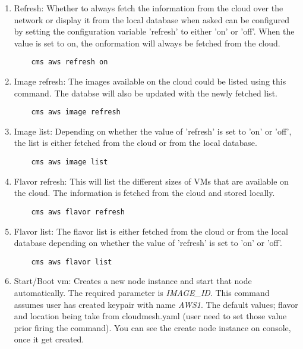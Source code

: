 \documentclass[9pt,twocolumn,twoside]{../../styles/osajnl}
\begin{document}
\begin{enumerate}
	
	\item Refresh: Whether to always fetch the information from the cloud over the network or display it from the local database when asked can be configured by setting the configuration variable 'refresh' to either 'on' or 'off'. When the value is set to on, the onformation will always be fetched from the cloud.
	
	\begin{verbatim}
    cms aws refresh on
	\end{verbatim}
	
	\item Image refresh: The images available on the cloud could be listed using this command. The databse will also be updated with the newly fetched list.
	
	\begin{verbatim}
    cms aws image refresh
	\end{verbatim}
	
	\item Image list: Depending on whether the value of 'refresh' is set to 'on' or 'off', the list is either fetched from the cloud or from the local database.
	
	\begin{verbatim}
    cms aws image list
	\end{verbatim}
	
	\item Flavor refresh: This will list the different sizes of VMs that are available on the cloud. The information is fetched from the cloud and stored locally.
	
	\begin{verbatim}
    cms aws flavor refresh
	\end{verbatim}
	
	\item Flavor list: The flavor list is either fetched from the cloud or from the local database depending on whether the value of 'refresh' is set to 'on' or 'off'.
	
	\begin{verbatim}
    cms aws flavor list
	\end{verbatim}
	
    \item Start/Boot vm: Creates a new node instance and start that node automatically. The required parameter is \textit{IMAGE\_ID}. This command assumes user has created keypair with name \textit{AWS1}. The default values; flavor and location being take from cloudmesh.yaml (user need to set those value prior firing the command). You can see the create node instance on console, once it get created.
    

\end{enumerate}
\end{document}
